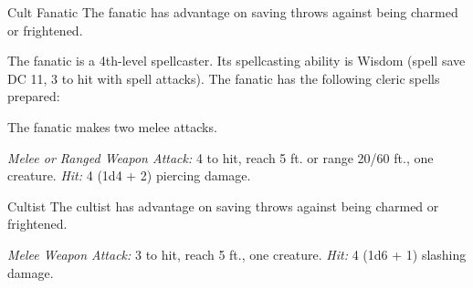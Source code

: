 \documentclass[10pt,a4paper,twoside,bg=print,twocolumn,openany,nodeprecatedcode]{dndbook}
\begin{document}
\begin{DndMonster}[float=t]{Cult Fanatic}
\DndMonsterBasics[
armor-class = {13 (\textit{leather armor})},
hit-points = {\DndDice{6d8 + 6}},
speed = {30 ft.}
]
\DndMonsterAbilityScores[
 str = 11,
 dex = 14,
 con = 12,
 int = 10,
 wis = 13,
 cha = 14
]
\DndMonsterDetails[
skills = {Deception +4, Persuasion +4, Religion +2},
languages = {any one language (usually Common)},
challenge = 2,
]
The fanatic has advantage on saving throws against being charmed or frightened.

The fanatic is a 4th-level spellcaster. Its spellcasting ability is Wisdom (spell save DC 11, 3 to hit with spell attacks). The fanatic has the following cleric spells prepared:
\begin{DndMonsterSpells}
\end{DndMonsterSpells}
The fanatic makes two melee attacks.

\textsl{Melee or Ranged Weapon Attack:} 4 to hit, reach 5 ft. or range 20/60 ft., one creature. \textsl{Hit:} 4 (1d4 + 2) piercing damage.

\end{DndMonster}



\begin{DndMonster}[float=t]{Cultist}
\DndMonsterBasics[
armor-class = {12 (\textit{leather armor})},
hit-points = {\DndDice{2d8}},
speed = {30 ft.}
]
\DndMonsterAbilityScores[
 str = 11,
 dex = 12,
 con = 10,
 int = 10,
 wis = 11,
 cha = 10
]
\DndMonsterDetails[
skills = {Deception +2, Religion +2},
languages = {any one language (usually Common)},
challenge = 1/8,
]
The cultist has advantage on saving throws against being charmed or frightened.

\textsl{Melee Weapon Attack:} 3 to hit, reach 5 ft., one creature. \textsl{Hit:} 4 (1d6 + 1) slashing damage.

\end{DndMonster}
\end{document}
